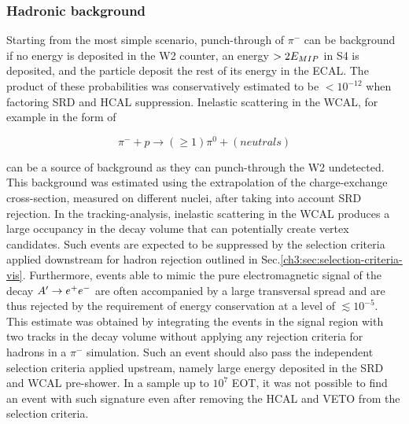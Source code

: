 \subsubsection{Hadronic background}
\label{ch3:sec:bkg:vis:hadr}

Starting from the most simple scenario, punch-through of $\pi^-$ can be background if no energy is deposited in the W2 counter, an energy $> 2E_{MIP}$ in S4 is deposited, and the particle deposit the rest of its energy in the ECAL. The product of these probabilities was conservatively estimated to be $< 10^{-12}$ when factoring SRD and HCAL suppression. Inelastic scattering in the WCAL, for example in the form of

\begin{equation}
  \label{eq:vis-int-neutral}
  \pi^- + p \rightarrow (\geq 1)\pi^0 + (neutrals)
\end{equation}

can be a source of background as they can punch-through the W2 undetected. This background was estimated using the extrapolation of the charge-exchange cross-section, measured on different nuclei, after taking into account SRD rejection. In the tracking-analysis, inelastic scattering in the WCAL produces a large occupancy in the decay volume that can potentially create vertex candidates. Such events are expected to be suppressed by the selection criteria applied downstream for hadron rejection outlined in Sec.\ref{ch3:sec:selection-criteria-vis}. Furthermore, events able to mimic the pure electromagnetic signal of the decay $A' \rightarrow e^+ e^-$ are often accompanied by a large transversal spread and are thus rejected by the requirement of energy conservation at a level of $\lesssim 10^{-5}$. This estimate was obtained by integrating the events in the signal region with two tracks in the decay volume without applying any rejection criteria for hadrons in a $\pi^-$ simulation. Such an event should also pass the independent selection criteria applied upstream, namely large energy deposited in the SRD and WCAL pre-shower. In a sample up to $10^7$ EOT, it was not possible to find an event with such signature even after removing the HCAL and VETO from the selection criteria.


